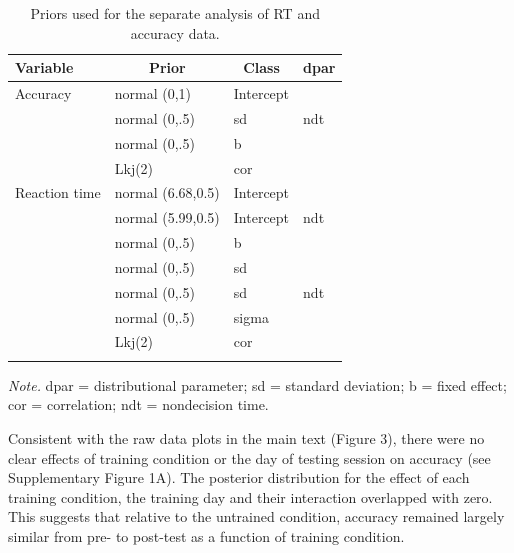 \documentclass[
  english,
  man,floatsintext]{apa6}
\begin{document}
\begin{table}[tbp]

\begin{center}
\begin{threeparttable}

\caption{\label{tab:prior-table}Priors used for the separate analysis of RT and accuracy data.}

\begin{tabular}{llll}
\toprule
Variable & \multicolumn{1}{c}{Prior} & \multicolumn{1}{c}{Class} & \multicolumn{1}{c}{dpar}\\
\midrule
Accuracy & normal (0,1) & Intercept & \\
 & normal (0,.5) & sd & ndt\\
 & normal (0,.5) & b & \\
 & Lkj(2) & cor & \\
Reaction time & normal (6.68,0.5) & Intercept & \\
 & normal (5.99,0.5) & Intercept & ndt\\
 & normal (0,.5) & b & \\
 & normal (0,.5) & sd & \\
 & normal (0,.5) & sd & ndt\\
 & normal (0,.5) & sigma & \\
 & Lkj(2) & cor & \\
\bottomrule
\addlinespace
\end{tabular}

\begin{tablenotes}[para]
\normalsize{\textit{Note.} dpar = distributional parameter; sd = standard deviation; b = fixed effect; cor = correlation; ndt = nondecision time.}
\end{tablenotes}

\end{threeparttable}
\end{center}

\end{table}

\newpage

Consistent with the raw data plots in the main text (Figure 3), there were no clear effects of training condition or the day of testing session on accuracy (see Supplementary Figure 1A). The posterior distribution for the effect of each training condition, the training day and their interaction overlapped with zero. This suggests that relative to the untrained condition, accuracy remained largely similar from pre- to post-test as a function of training condition.
\end{document}
